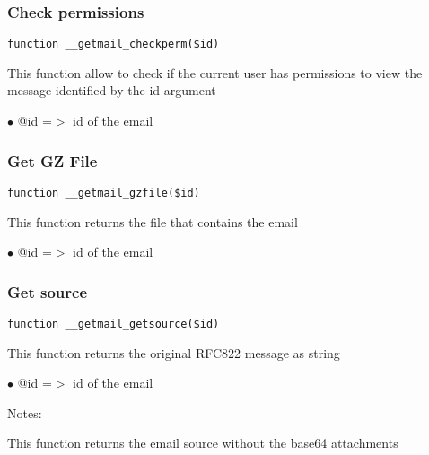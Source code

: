 \documentclass[a4paper]{article}
\begin{document}
\hypertarget{toc79}{}
\subsubsection{Check permissions}

\begin{lstlisting}
function __getmail_checkperm($id)
\end{lstlisting}

This function allow to check if the current user has permissions to view the
message identified by the id argument

\begin{compactitem}
\item[\color{myblue}$\bullet$] @id =$>$ id of the email
\end{compactitem}

\hypertarget{toc80}{}
\subsubsection{Get GZ File}

\begin{lstlisting}
function __getmail_gzfile($id)
\end{lstlisting}

This function returns the file that contains the email

\begin{compactitem}
\item[\color{myblue}$\bullet$] @id =$>$ id of the email
\end{compactitem}

\hypertarget{toc81}{}
\subsubsection{Get source}

\begin{lstlisting}
function __getmail_getsource($id)
\end{lstlisting}

This function returns the original RFC822 message as string

\begin{compactitem}
\item[\color{myblue}$\bullet$] @id =$>$ id of the email
\end{compactitem}

Notes:

This function returns the email source without the base64 attachments
\end{document}
